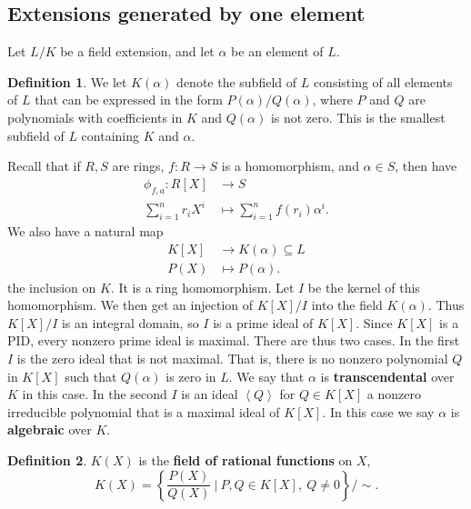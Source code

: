 \documentclass{article}
\newcommand{\rb}[1]{\left( #1 \right)}
\renewcommand{\sb}[1]{\left[ #1 \right]}
\newcommand{\cb}[1]{\left\{ #1 \right\}}
\newcommand{\ab}[1]{\left\langle #1 \right\rangle}
\theoremstyle{definition}\newtheorem{definition}{Definition}[subsection]
\theoremstyle{definition}\newtheorem{remark}[definition]{Remark}
\theoremstyle{definition}\newtheorem*{example}{Example}
\theoremstyle{definition}\newtheorem*{note}{Note}
\begin{document}

\subsection{Extensions generated by one element}

Let $ L / K $ be a field extension, and let $ \alpha $ be an element of $ L $.

\begin{definition}
We let $ K\rb{\alpha} $ denote the subfield of $ L $ consisting of all elements of $ L $ that can be expressed in the form $ P\rb{\alpha} / Q\rb{\alpha} $, where $ P $ and $ Q $ are polynomials with coefficients in $ K $ and $ Q\rb{\alpha} $ is not zero. This is the smallest subfield of $ L $ containing $ K $ and $ \alpha $.
\end{definition}

Recall that if $ R, S $ are rings, $ f : R \to S $ is a homomorphism, and $ \alpha \in S $, then have
\begin{align*}
\phi_{f, a} : R\sb{X} & \to S \\
\sum_{i = 1}^n r_iX^i & \mapsto \sum_{i = 1}^n f\rb{r_i}\alpha^i.
\end{align*}
We also have a natural map
\begin{align*}
K\sb{X} & \to K\rb{\alpha} \subseteq L \\
P\rb{X} & \mapsto P\rb{\alpha}.
\end{align*}
the inclusion on $ K $. It is a ring homomorphism. Let $ I $ be the kernel of this homomorphism. We then get an injection of $ K\sb{X} / I $ into the field $ K\rb{\alpha} $. Thus $ K\sb{X} / I $ is an integral domain, so $ I $ is a prime ideal of $ K\sb{X} $. Since $ K\sb{X} $ is a PID, every nonzero prime ideal is maximal. There are thus two cases. In the first $ I $ is the zero ideal that is not maximal. That is, there is no nonzero polynomial $ Q $ in $ K\sb{X} $ such that $ Q\rb{\alpha} $ is zero in $ L $. We say that $ \alpha $ is \textbf{transcendental} over $ K $ in this case. In the second $ I $ is an ideal $ \ab{Q} $ for $ Q \in K\sb{X} $ a nonzero irreducible polynomial that is a maximal ideal of $ K\sb{X} $. In this case we say $ \alpha $ is \textbf{algebraic} over $ K $.

\begin{definition}
$ K\rb{X} $ is the \textbf{field of rational functions} on $ X $,
$$ K\rb{X} = \cb{\dfrac{P\rb{X}}{Q\rb{X}} \ \Bigg| \ P, Q \in K\sb{X}, \ Q \ne 0} / \sim. $$
\end{definition}
\end{document}
